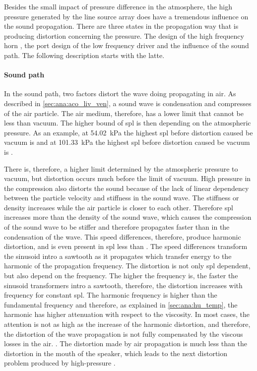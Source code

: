 Besides the small impact of pressure difference in the atmosphere, the high pressure generated by the line source array does have a tremendous influence on the sound propagation. There are three states in the propagation way that is producing distortion concerning the pressure. The design of the high frequency horn \citep{czerwinski1999air}, the port design of the low frequency driver \citep{vanderkooy1998nonlinearities} and the influence of the sound path. The following description starts with the latte.


\paragraph{Sound path} In the sound path, two factors distort the wave doing propagating in air. As described in \autoref{sec:ana:aco_liv_ven}, a sound wave is condensation and compresses of the air particle. The air medium, therefore, has a lower limit that cannot be less than vacuum. The higher bound of \gls{spl} is then depending on the atmospheric pressure. As an example, at \SI{54.02}{\kilo\pascal} the highest \gls{spl} before distortion caused be vacuum is  and at \SI{101.33}{\kilo\pascal} the highest \gls{spl} before distortion caused be vacuum is . 

There is, therefore, a higher limit determined by the atmospheric pressure to vacuum,  but distortion occurs much before the limit of vacuum.  High pressure in the compression also distorts the sound because of the lack of linear dependency between the particle velocity and stiffness in the sound wave. The stiffness or density increases while the air particle is closer to each other. Therefore \gls{spl} increases more than the density of the sound wave, which causes the compression of the sound wave to be stiffer and therefore propagates faster than in the condensation of the wave. This speed differences, therefore, produce harmonic distortion, and is even present in \gls{spl} less than  \citep{czerwinski1999air}. The speed differences transform the sinusoid intro a sawtooth as it propagates which transfer energy to the harmonic of the propagation frequency. The distortion is not only \gls{spl} dependent, but also depend on the frequency. The higher the frequency is, the faster the sinusoid transformers intro a sawtooth, therefore, the distortion increases with frequency for constant \gls{spl}. The harmonic frequency is higher than the fundamental frequency and therefore, as explained in \autoref{sec:ana:hu_temp}, the harmonic has higher attenuation with respect to the viscosity. In most cases, the attention is not as high as the increase of the harmonic distortion, and therefore, the distortion of the wave propagation is not fully compensated by the viscous losses in the air. \citep{czerwinski1999air}. 
The distortion made by air propagation is much less than the distortion in the mouth of the speaker, which leads to the next distortion problem produced by high-pressure \citep{czerwinski1999air}.

